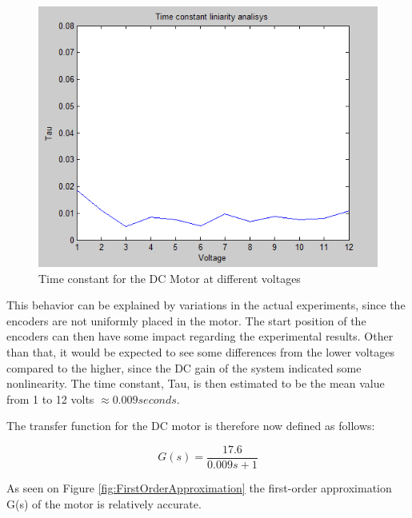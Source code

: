 \begin{figure}[h!]
\centering
\includegraphics[scale=0.5]{Billeder/TimeConstantLinearityAnalysis.png}
\caption{Time constant for the DC Motor at different voltages}
\label{fig:TimeConstantLinearityAnalysis}
\end{figure}

This behavior can be explained by variations in the actual experiments, since the encoders are not uniformly placed in the motor. The start position of the encoders can then have some impact regarding the experimental results. Other than that, it would be expected to see some differences from the lower voltages compared to the higher, since the DC gain of the system indicated some nonlinearity. The time constant, Tau, is then estimated to be the mean value from 1 to 12 volts $\approx 0.009 seconds$.

The transfer function for the DC motor is therefore now defined as follows:

\begin{equation}
G(s)=\frac{17.6}{0.009s+1}
\end{equation}

As seen on Figure \ref{fig:FirstOrderApproximation} the first-order approximation G(s) of the motor is relatively accurate.

